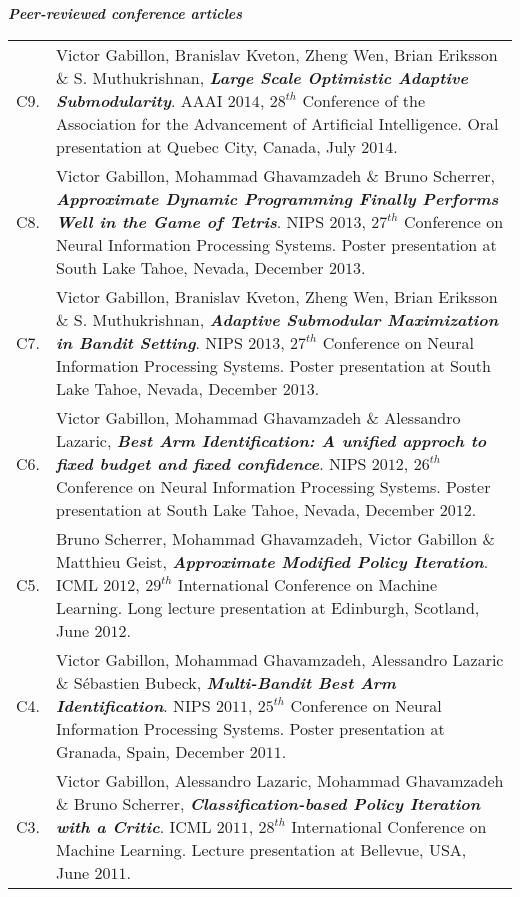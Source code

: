 \noindent\textit{\textbf{Peer-reviewed conference articles}}\\
\noindent\begin{tabularx}{\columnwidth}{@{} l X @{}}
C9. & Victor Gabillon, Branislav Kveton, Zheng Wen, Brian Eriksson $\&$ S. Muthukrishnan, \textbf{\emph{Large Scale Optimistic Adaptive Submodularity}}.
AAAI $2014$, $28^{th}$ Conference of the Association for the Advancement of  Artificial Intelligence.
Oral presentation at Quebec City, Canada, July $2014$.\\

C8. & Victor Gabillon, Mohammad Ghavamzadeh $\&$ Bruno Scherrer, 
\textbf{\emph{Approximate Dynamic Programming Finally Performs Well in the Game of Tetris}}.
NIPS $2013$, $27^{th}$ Conference on Neural Information Processing Systems.
Poster presentation at South Lake Tahoe, Nevada, December $2013$.\\


C7. & Victor Gabillon, Branislav Kveton, Zheng Wen, Brian Eriksson $\&$ S. Muthukrishnan, \textbf{\emph{Adaptive Submodular Maximization in Bandit Setting}}.
NIPS $2013$, $27^{th}$ Conference on Neural Information Processing Systems.
Poster presentation at South Lake Tahoe, Nevada, December $2013$.\\


C6. & Victor Gabillon, Mohammad Ghavamzadeh $\&$  Alessandro Lazaric, \textbf{\emph{Best Arm Identification: A unified approch to fixed budget and fixed confidence}}.
NIPS $2012$, $26^{th}$ Conference on Neural Information Processing Systems.
Poster presentation at South Lake Tahoe, Nevada, December $2012$.\\


C5. & Bruno Scherrer, Mohammad Ghavamzadeh, Victor Gabillon $\&$ Matthieu Geist, \textbf{\emph{Approximate Modified Policy Iteration}}.
ICML $2012$, $29^{th}$  International Conference on Machine Learning.
Long lecture presentation at Edinburgh, Scotland, June $2012$.\\


C4. & Victor Gabillon, Mohammad Ghavamzadeh, Alessandro Lazaric $\&$ Sébastien Bubeck, \textbf{\emph{Multi-Bandit Best Arm Identification}}.
NIPS $2011$, $25^{th}$ Conference on Neural Information Processing Systems.
Poster presentation at Granada, Spain, December $2011$.\\


C3. & Victor Gabillon, Alessandro Lazaric, Mohammad Ghavamzadeh $\&$  Bruno Scherrer, \textbf{ \emph{Classification-based Policy Iteration with a Critic}}. ICML $2011$, $28^{th}$  International Conference on Machine Learning. Lecture presentation at Bellevue, USA, June $2011$.\\


\end{tabularx}
